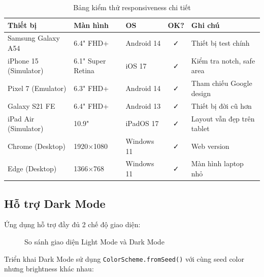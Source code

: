 \begin{table}[H]
\centering
\caption{Bảng kiểm thử responsiveness chi tiết}
\label{tab:responsiveness}
\begin{tabularx}{\textwidth}{|l|l|l|c|X|}
\hline
\textbf{Thiết bị} & \textbf{Màn hình} & \textbf{OS} & \textbf{OK?} & \textbf{Ghi chú} \\
\hline
Samsung Galaxy A54 & 6.4" FHD+ & Android 14 & ✓ & Thiết bị test chính \\
\hline
iPhone 15 (Simulator) & 6.1" Super Retina & iOS 17 & ✓ & Kiểm tra notch, safe area \\
\hline
Pixel 7 (Emulator) & 6.3" FHD+ & Android 14 & ✓ & Tham chiếu Google design \\
\hline
Galaxy S21 FE & 6.4" FHD+ & Android 13 & ✓ & Thiết bị đời cũ hơn \\
\hline
iPad Air (Simulator) & 10.9" & iPadOS 17 & ✓ & Layout vẫn đẹp trên tablet \\
\hline
Chrome (Desktop) & 1920$\times$1080 & Windows 11 & ✓ & Web version \\
\hline
Edge (Desktop) & 1366$\times$768 & Windows 11 & ✓ & Màn hình laptop nhỏ \\
\hline
\end{tabularx}
\end{table}

\subsection{Hỗ trợ Dark Mode}

Ứng dụng hỗ trợ đầy đủ 2 chế độ giao diện:

\begin{figure}[H]
\centering
{}
\hspace{1cm}
\caption{So sánh giao diện Light Mode và Dark Mode}
\label{fig:light-dark}
\end{figure}

Triển khai Dark Mode sử dụng \texttt{ColorScheme.fromSeed()} với cùng seed color nhưng brightness khác nhau:

